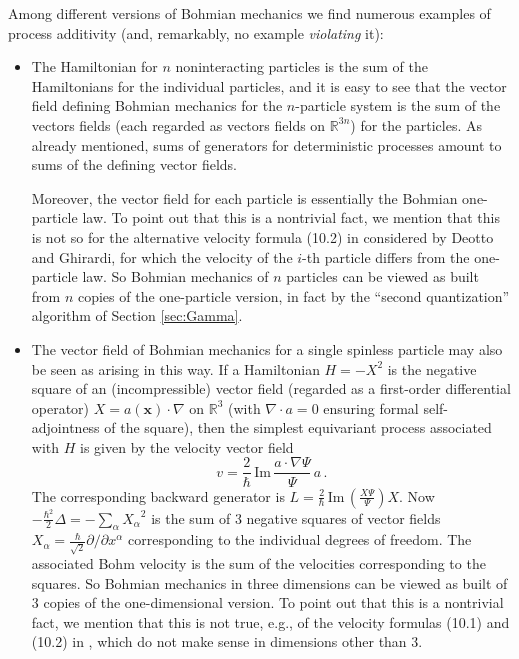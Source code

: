 \documentclass[12pt]{article}
\newcommand{\RRR}{\mathbb{R}} %
\newcommand{\1}{\mathbf{1}} %
\newcommand{\Laplace}{\Delta} %
\renewcommand{\Im}{\mathrm{Im}} %
\newcommand{\vx}{{\boldsymbol x}} %
\begin{document}
Among different versions of Bohmian mechanics we find numerous
examples of process additivity (and, remarkably, no example
\emph{violating} it):
\begin{itemize}
\item The Hamiltonian for $n$ noninteracting particles is the sum of
   the Hamiltonians for the individual particles, and it is easy to see
   that the vector field defining Bohmian mechanics for the
   $n$-particle system is the sum of the vectors fields (each regarded
   as vectors fields on $\RRR^{3n}$) for the particles. As already
   mentioned, sums of generators for deterministic processes amount to
   sums of the defining vector fields.

   Moreover, the vector field for each particle is essentially the
   Bohmian one-particle law. To point out that this is a nontrivial
   fact, we mention that this is not so for the alternative velocity
   formula (10.2) in \cite{Deotto} considered by Deotto and Ghirardi,
   for which the velocity of the $i$-th particle differs from the
   one-particle law. So Bohmian mechanics of $n$ particles can be
   viewed as built from $n$ copies of the one-particle version, in fact
   by the ``second quantization'' algorithm of Section \ref{sec:Gamma}.

\item The vector field of Bohmian mechanics for a single spinless
   particle may also be seen as arising in this way. If a Hamiltonian
   $H=-X^2$ is the negative square of an (incompressible) vector field
   (regarded as a first-order differential operator) $X=a(\vx) \!\cdot\!
   \nabla$ on $\RRR^3$ (with $\nabla \!\cdot\! a=0$ ensuring formal
   self-adjointness of the square), then the simplest equivariant
   process associated with $H$ is given by the velocity vector field
   \[
      v= \frac{2}{\hbar} \, \Im \,\frac{a\cdot \nabla \Psi}{\Psi}\, a\, .
   \]
   The corresponding backward generator is $L = \frac{2}{\hbar} \, \Im
   \, (\frac{X\Psi}{\Psi}) X$.  Now $-\frac{\hbar^2}{2}\Laplace =
   -\sum_{\alpha}{X_{\alpha}}^2$ is the sum of 3 negative squares of
   vector fields $X_{\alpha} = \frac{\hbar} {\sqrt{2}} \partial /
   \partial x^\alpha$ corresponding to the individual degrees of
   freedom. The associated Bohm velocity is the sum of the velocities
   corresponding to the squares. So Bohmian mechanics in three
   dimensions can be viewed as built of 3 copies of the one-dimensional
   version. To point out that this is a nontrivial fact, we mention
   that this is not true, e.g., of the velocity formulas (10.1) and
   (10.2) in \cite{Deotto}, which do not make sense in dimensions other
   than 3.


\end{itemize}
\end{document}
